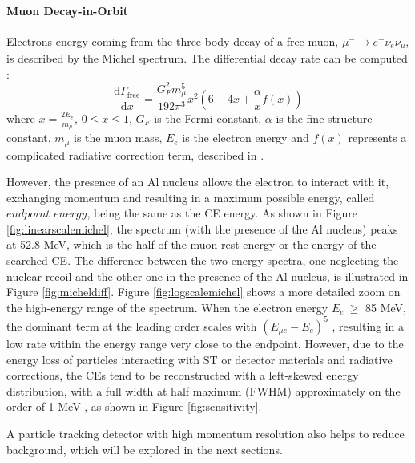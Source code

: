 \paragraph{Muon Decay-in-Orbit}
Electrons energy coming from the three body decay of a free muon, 
$\mu^- \rightarrow e^- \bar{\nu}_e \nu_\mu$, is described by the Michel 
spectrum. The differential decay rate can be computed \cite{michel}:
\begin{equation}
    \frac{\text{d}\Gamma_{\text{free}}}{\text{d}x}= \frac{G^2_F m^5_\mu}{192 \pi^3}x^2(6-4x+\frac{\alpha}{x}f(x)) 
\end{equation}
where $x=\frac{2 E_e}{m_\mu}$, $0\leq x\leq 1$, $G_F$ is the Fermi constant, 
$\alpha$ is the fine-structure constant, $m_\mu$ is the muon mass, $E_e$ is the 
electron energy and $f (x)$ represents a complicated radiative correction term, 
described in \cite{PhysRev.113.1652}.

However, the presence of an Al nucleus allows the electron to 
interact with it, exchanging momentum and resulting in a maximum possible energy, called 
$endpoint$ $energy$, being the same as the CE energy. 
As shown in Figure \ref{fig:linearscalemichel}, the spectrum (with the presence of the Al nucleus) peaks at 
52.8 MeV, which is the half of the muon rest energy or the energy of the searched CE.
The difference between the two energy spectra, one neglecting the nuclear recoil and the 
other one in the presence of the Al nucleus, is illustrated in Figure \ref{fig:micheldiff}. 
Figure \ref{fig:logscalemichel} shows a more detailed zoom on the high-energy 
range of the spectrum. When the electron energy $E_e \ \geq$ 85 MeV, the dominant term 
at the leading order scales with $(E_{\mu e} - E_e)^5$ \cite{PhysRevD.84.013006}, 
resulting in a low rate within the energy range very close to the endpoint. However, due to 
the energy loss of particles interacting with ST or detector materials and radiative corrections, 
the CEs tend to be reconstructed with a left-skewed energy distribution,
with a full width at half maximum (FWHM) approximately on the order of 1 MeV 
\cite{gaponenko}, as shown in Figure \ref{fig:sensitivity}.

A particle tracking detector with high momentum resolution 
also helps to reduce background, which will be explored in the next sections.

